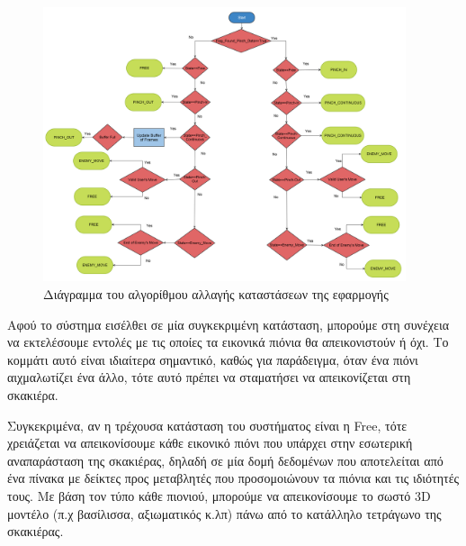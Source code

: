 \begin{figure}[H]
    \centering
    \includegraphics[width=0.95\textwidth]{Files/Figures/change_of_states.png}
    \caption[Διάγραμμα του αλγορίθμου αλλαγής καταστάσεων της εφαρμογής]{Διάγραμμα του αλγορίθμου αλλαγής καταστάσεων της εφαρμογής}
    \label{fig:states}
\end{figure}






Αφού το σύστημα εισέλθει σε μία συγκεκριμένη κατάσταση, μπορούμε στη συνέχεια να εκτελέσουμε εντολές με τις οποίες τα εικονικά πιόνια θα απεικονιστούν ή όχι. Το κομμάτι αυτό είναι ιδιαίτερα σημαντικό, καθώς για παράδειγμα, όταν ένα πιόνι αιχμαλωτίζει ένα άλλο, τότε αυτό πρέπει να σταματήσει να απεικονίζεται στη σκακιέρα.


Συγκεκριμένα, αν η τρέχουσα κατάσταση του συστήματος είναι η Free, τότε χρειάζεται να απεικονίσουμε κάθε εικονικό πιόνι που υπάρχει στην εσωτερική αναπαράσταση της σκακιέρας, δηλαδή σε μία δομή δεδομένων που αποτελείται από ένα πίνακα με δείκτες προς μεταβλητές που προσομοιώνουν τα πιόνια και τις ιδιότητές τους. Με βάση τον τύπο κάθε πιονιού, μπορούμε να απεικονίσουμε το σωστό 3D μοντέλο (π.χ βασίλισσα, αξιωματικός κ.λπ) πάνω από το κατάλληλο τετράγωνο της σκακιέρας. 


